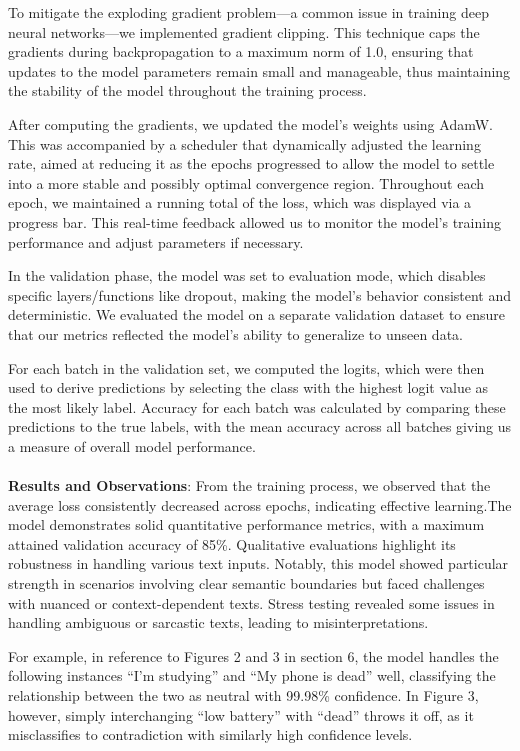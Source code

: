 \documentclass[11pt,a4paper]{article}
\begin{document}
To mitigate the exploding gradient problem—a common issue in training deep neural networks—we implemented gradient clipping. This technique caps the gradients during backpropagation to a maximum norm of 1.0, ensuring that updates to the model parameters remain small and manageable, thus maintaining the stability of the model throughout the training process.

After computing the gradients, we updated the model's weights using AdamW. This was accompanied by a scheduler that dynamically adjusted the learning rate, aimed at reducing it as the epochs progressed to allow the model to settle into a more stable and possibly optimal convergence region. Throughout each epoch, we maintained a running total of the loss, which was displayed via a progress bar. This real-time feedback allowed us to monitor the model's training performance and adjust parameters if necessary.

In the validation phase, the model was set to evaluation mode, which disables specific layers/functions like dropout, making the model's behavior consistent and deterministic. We evaluated the model on a separate validation dataset to ensure that our metrics reflected the model's ability to generalize to unseen data.

For each batch in the validation set, we computed the logits, which were then used to derive predictions by selecting the class with the highest logit value as the most likely label. Accuracy for each batch was calculated by comparing these predictions to the true labels, with the mean accuracy across all batches giving us a measure of overall model performance.
\\~\\
\textbf{Results and Observations}: From the training process, we observed that the average loss consistently decreased across epochs, indicating effective learning.The model demonstrates solid quantitative performance metrics, with a maximum attained validation accuracy of 85\%. Qualitative evaluations highlight its robustness in handling various text inputs. Notably, this model showed particular strength in scenarios involving clear semantic boundaries but faced challenges with nuanced or context-dependent texts. Stress testing revealed some issues in handling ambiguous or sarcastic texts, leading to misinterpretations. 

For example, in reference to Figures 2 and 3 in section 6, the model handles the following instances “I’m studying” and “My phone is dead” well, classifying the relationship between the two as neutral with 99.98\% confidence. In Figure 3, however, simply interchanging “low battery” with “dead” throws it off, as it misclassifies to contradiction with similarly high confidence levels. 
\end{document}
